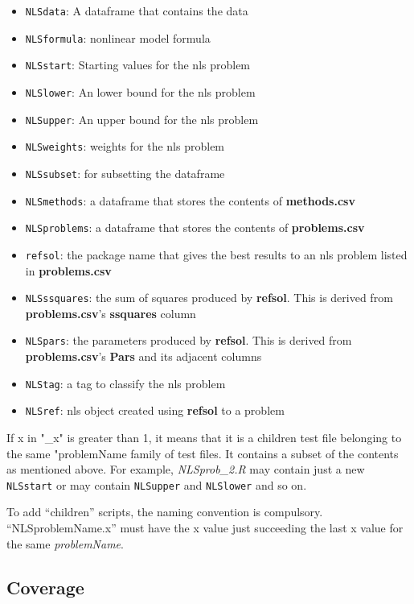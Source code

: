 \begin{itemize}
\tightlist
\item
  \texttt{NLSdata}: A dataframe that contains the data
\item
  \texttt{NLSformula}: nonlinear model formula
\item
  \texttt{NLSstart}: Starting values for the nls problem
\item
  \texttt{NLSlower}: An lower bound for the nls problem
\item
  \texttt{NLSupper}: An upper bound for the nls problem
\item
  \texttt{NLSweights}: weights for the nls problem
\item
  \texttt{NLSsubset}: for subsetting the dataframe
\item
  \texttt{NLSmethods}: a dataframe that stores the contents of
  \textbf{methods.csv}
\item
  \texttt{NLSproblems}: a dataframe that stores the contents of
  \textbf{problems.csv}
\item
  \texttt{refsol}: the package name that gives the best results to an
  nls problem listed in \textbf{problems.csv}
\item
  \texttt{NLSssquares}: the sum of squares produced by \textbf{refsol}.
  This is derived from \textbf{problems.csv}'s \textbf{ssquares} column
\item
  \texttt{NLSpars}: the parameters produced by \textbf{refsol}. This is
  derived from \textbf{problems.csv}'s \textbf{Pars} and its adjacent
  columns
\item
  \texttt{NLStag}: a tag to classify the nls problem
\item
  \texttt{NLSref}: nls object created using \textbf{refsol} to a problem
\end{itemize}

If x in "\_x" is greater than 1, it means that it is a children test
file belonging to the same "problemName family of test files. It
contains a subset of the contents as mentioned above. For example,
\emph{NLSprob\_2.R} may contain just a new \texttt{NLSstart} or may
contain \texttt{NLSupper} and \texttt{NLSlower} and so on.

To add ``children'' scripts, the naming convention is compulsory.
``NLSproblemName.x'' must have the x value just succeeding the last x
value for the same \emph{problemName}.

\hypertarget{coverage}{%
\subsection{Coverage}\label{coverage}}

